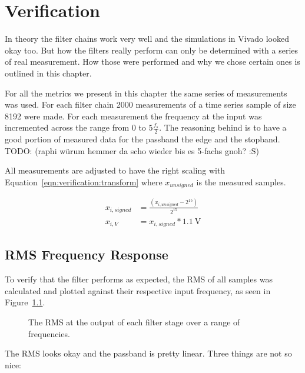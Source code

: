 \chapter{Verification}
\label{ch:verification}

In theory the filter chains work very well and the simulations in Vivado looked okay too.
But how the filters really perform can only be determined with a series of real measurement.
How those were performed and why we chose certain ones is outlined in this chapter.

For all the metrics we present in this chapter the same series of measurements was used.
For each filter chain 2000 measurements of a time series sample of size 8192 were made.
For each measurement the frequency at the input was incremented across the range from 0 to $5\frac{f_s}{2}$.
The reasoning behind is to have a good portion of measured data for the passband the edge and the stopband.
TODO: (raphi würum hemmer da scho wieder bis es 5-fachs gnoh? :S)

All measurements are adjusted to have the right scaling with Equation~\ref{eqn:verification:transform} where $x_{unsigned}$ is the measured samples.

\begin{align}
    \label{eqn:verification:transform}
    x_{i,signed} &= \frac{(x_{i,unsigned} - 2^{15})}{2^{15}}\\
    x_{i,V} &= x_{i,signed} * \SI{1.1}{\V}
\end{align}

\section{RMS Frequency Response}
\label{sec:verification:rms}

To verify that the filter performs as expected, the RMS of all samples was calculated and plotted against their respective input frequency, as seen in Figure~\ref{fig:verification:rmsAll}.

\begin{figure}
    \centering
    
    \caption[The RMS at the output of each filter stage over a range of frequencies.]{%
        The RMS at the output of each filter stage over a range of frequencies.%
    }
    \label{fig:verification:rmsAll}
\end{figure}

The RMS looks okay and the passband is pretty linear. Three things are not so nice:

